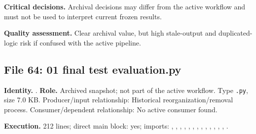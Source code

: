 \documentclass[
  11pt,
  a4paper]{article}
\begin{document}
\textbf{Critical decisions.} Archival decisions may differ from the
active workflow and must not be used to interpret current frozen
results.

\textbf{Quality assessment.} Clear archival value, but high stale-output
and duplicated-logic risk if confused with the active pipeline.

\subsection{File 64: 01 final test
evaluation.py}\label{file-8590997079844270352}

\textbf{Identity.}
.
\textbf{Role.} Archived snapshot; not part of the active workflow. Type
\texttt{.py}, size 7.0 KB. Producer/input relationship: Historical
reorganization/removal process. Consumer/dependent relationship: No
active consumer found.

\textbf{Execution.} 212 lines; direct main block: yes; imports:
, , ,
,
,
,
,
,
,
,
,
,
,
.
\end{document}
